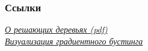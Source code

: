 \documentclass[14pt]{beamer}
\begin{document}
\begin{frame}
	\frametitle{Ссылки}
	\href{https://github.com/esokolov/ml-course-msu/blob/master/ML16/lecture-notes/Sem04_trees.pdf}{\textit{О решающих деревьях (pdf)}}\\
	\href{http://arogozhnikov.github.io/2016/06/24/gradient_boosting_explained.html}{\textit{Визуализация градиентного бустинга}}\\

\end{frame}
\end{document}
